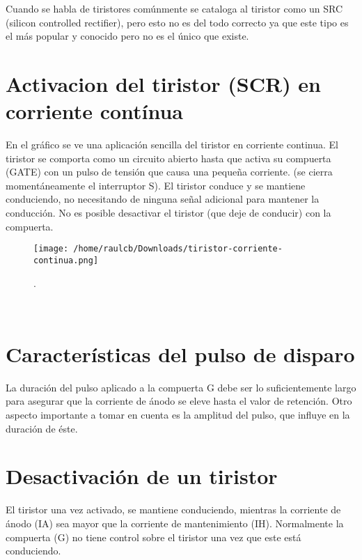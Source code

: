 \documentclass[11pt]{article}
\begin{document}
Cuando se habla de tiristores comúnmente se cataloga al tiristor como un SRC (silicon controlled rectifier), pero esto no es del todo correcto ya que este tipo es el más popular y conocido pero no es el único que existe.

\section{Activacion del tiristor (SCR) en corriente contínua}
En el gráfico se ve una aplicación sencilla del tiristor en corriente continua. El tiristor se comporta como un circuito abierto hasta que activa su compuerta (GATE) con un pulso de tensión que causa una pequeña corriente. (se cierra momentáneamente el interruptor S). El tiristor conduce y se mantiene conduciendo, no necesitando de ninguna señal adicional para mantener la conducción. No es posible desactivar el tiristor (que deje de conducir) con la compuerta.
\\
\begin{figure}[htp]
\centering
\texttt{[image: /home/raulcb/Downloads/tiristor-corriente-continua.png]}
\caption{.}
\label{.}
\end{figure}
\\

\section{Características del pulso de disparo}
La duración del pulso aplicado a la compuerta G debe ser lo suficientemente largo para asegurar que la corriente de ánodo se eleve hasta el valor de retención. Otro aspecto importante a tomar en cuenta es la amplitud del pulso, que influye en la duración de éste.

\section{Desactivación de un tiristor}

El tiristor una vez activado, se mantiene conduciendo, mientras la corriente de ánodo (IA) sea mayor que la corriente de mantenimiento (IH). Normalmente la compuerta (G) no tiene control sobre el tiristor una vez que este está conduciendo.
\end{document}
